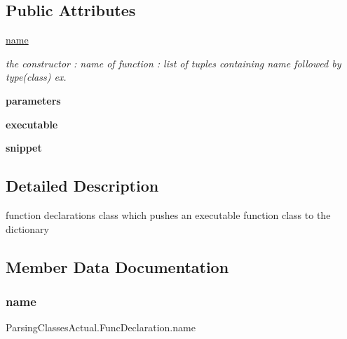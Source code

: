 \subsection*{Public Attributes}
\begin{DoxyCompactItemize}
\item 
\hyperlink{class_parsing_classes_actual_1_1_func_declaration_ac13c88a74a9e9cbf894f96a8b9295cbd}{name}
\begin{DoxyCompactList}\small\item\em the constructor  \+: name of function  \+: list of tuples containing name followed by type(class) ex. \end{DoxyCompactList}\item 
\mbox{\label{class_parsing_classes_actual_1_1_func_declaration_ad856297c8aa971160a0e892db7b787fc}} 
{\bfseries parameters}
\item 
\mbox{\label{class_parsing_classes_actual_1_1_func_declaration_a2596cd4bcb7077b2191c4c84620b4340}} 
{\bfseries executable}
\item 
\mbox{\label{class_parsing_classes_actual_1_1_func_declaration_a5db10dfbfe72933c0218a16fdb83e7d0}} 
{\bfseries snippet}
\end{DoxyCompactItemize}


\subsection{Detailed Description}
function declarations class which pushes an executable function class to the dictionary 

\subsection{Member Data Documentation}
\mbox{\label{class_parsing_classes_actual_1_1_func_declaration_ac13c88a74a9e9cbf894f96a8b9295cbd}} 
\subsubsection{\texorpdfstring{name}{name}}
{\footnotesize\ttfamily Parsing\+Classes\+Actual.\+Func\+Declaration.\+name}




